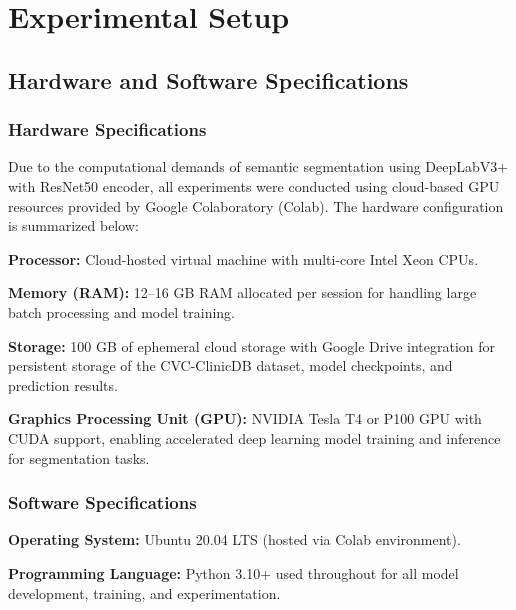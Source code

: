 \documentclass[a4paper,12pt]{report}
\begin{document}
\chapter{Experimental Setup}

\section{Hardware and Software Specifications}

\subsection{Hardware Specifications}

Due to the computational demands of semantic segmentation using DeepLabV3+ with ResNet50 encoder, all experiments were conducted using cloud-based GPU resources provided by Google Colaboratory (Colab). The hardware configuration is summarized below:
\vspace{1em}

\textbf{Processor:} Cloud-hosted virtual machine with multi-core Intel Xeon CPUs.

\textbf{Memory (RAM):} 12--16 GB RAM allocated per session for handling large batch processing and model training.

\textbf{Storage:} 100 GB of ephemeral cloud storage with Google Drive integration for persistent storage of the CVC-ClinicDB dataset, model checkpoints, and prediction results.

\textbf{Graphics Processing Unit (GPU):} NVIDIA Tesla T4 or P100 GPU with CUDA support, enabling accelerated deep learning model training and inference for segmentation tasks.


\subsection{Software Specifications}

\textbf{Operating System:} Ubuntu 20.04 LTS (hosted via Colab environment).

\vspace{1em}

\textbf{Programming Language:} Python 3.10+ used throughout for all model development, training, and experimentation.

\vspace{1em}
\end{document}
